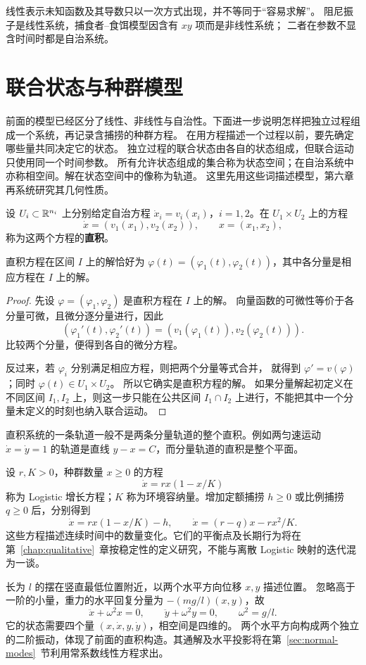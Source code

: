 线性表示未知函数及其导数只以一次方式出现，并不等同于“容易求解”。
阻尼振子是线性系统，捕食者--食饵模型因含有 $xy$ 项而是非线性系统；
二者在参数不显含时间时都是自治系统。

\section{联合状态与种群模型}\label{sec:joint-models}
前面的模型已经区分了线性、非线性与自治性。下面进一步说明怎样把独立过程组成一个系统，再记录含捕捞的种群方程。
在用方程描述一个过程以前，要先确定哪些量共同决定它的状态。
独立过程的联合状态由各自的状态组成，但联合运动只使用同一个时间参数。
所有允许状态组成的集合称为状态空间；在自治系统中亦称相空间。解在状态空间中的像称为轨道。
这里先用这些词描述模型，第六章再系统研究其几何性质。

\begin{definition}[方程的直积]
	设 $U_i\subset\mathbb{R}^{n_i}$ 上分别给定自治方程
	$\dot x_i=v_i(x_i)$，$i=1,2$。在 $U_1\times U_2$ 上的方程
	\[
	\dot x=(v_1(x_1),v_2(x_2)),\qquad x=(x_1,x_2),
	\]
	称为这两个方程的\textbf{直积}。
\end{definition}
\begin{proposition}
	直积方程在区间 $I$ 上的解恰好为
	$\varphi(t)=(\varphi_1(t),\varphi_2(t))$，其中各分量是相应方程在 $I$ 上的解。
\end{proposition}
\begin{proof}
	先设 $\varphi=(\varphi_1,\varphi_2)$ 是直积方程在 $I$ 上的解。
	向量函数的可微性等价于各分量可微，且微分逐分量进行，因此
	\[
	(\varphi_1'(t),\varphi_2'(t))
	=(v_1(\varphi_1(t)),v_2(\varphi_2(t))).
	\]
	比较两个分量，便得到各自的微分方程。
	
	反过来，若 $\varphi_i$ 分别满足相应方程，则把两个分量等式合并，
	就得到 $\varphi'=v(\varphi)$；同时 $\varphi(t)\in U_1\times U_2$。
	所以它确实是直积方程的解。
	如果分量解起初定义在不同区间 $I_1,I_2$ 上，则这一步只能在公共区间
	$I_1\cap I_2$ 上进行，不能把其中一个分量未定义的时刻也纳入联合运动。
\end{proof}
直积系统的一条轨道一般不是两条分量轨道的整个直积。例如两匀速运动
$\dot x=\dot y=1$ 的轨道是直线 $y-x=C$，而分量轨道的直积是整个平面。

\begin{definition}[连续 Logistic 模型]\label{def:continuous-logistic}
	设 $r,K>0$，种群数量 $x\geq0$ 的方程
	\[
	\dot x=rx(1-x/K)
	\]
	称为 Logistic 增长方程；$K$ 称为环境容纳量。增加定额捕捞 $h\geq0$
	或比例捕捞 $q\geq0$ 后，分别得到
	\[
	\dot x=rx(1-x/K)-h,\qquad
	\dot x=(r-q)x-rx^2/K.
	\]
	这些方程描述连续时间中的数量变化。它们的平衡点及长期行为将在第~\ref{chap:qualitative}~章按稳定性的定义研究，不能与离散 Logistic 映射的迭代混为一谈。
\end{definition}
\begin{example}[球摆的小振动]
	长为 $l$ 的摆在竖直最低位置附近，以两个水平方向位移 $x,y$ 描述位置。
	忽略高于一阶的小量，重力的水平回复分量为 $-(mg/l)(x,y)$，故
	\[
	\ddot x+\omega^2x=0,\qquad \ddot y+\omega^2y=0,
	\qquad \omega^2=g/l.
	\]
	它的状态需要四个量 $(x,\dot x,y,\dot y)$，相空间是四维的。
	两个水平方向构成两个独立的二阶振动，体现了前面的直积构造。其通解及水平投影将在第~\ref{sec:normal-modes}~节利用常系数线性方程求出。
\end{example}



